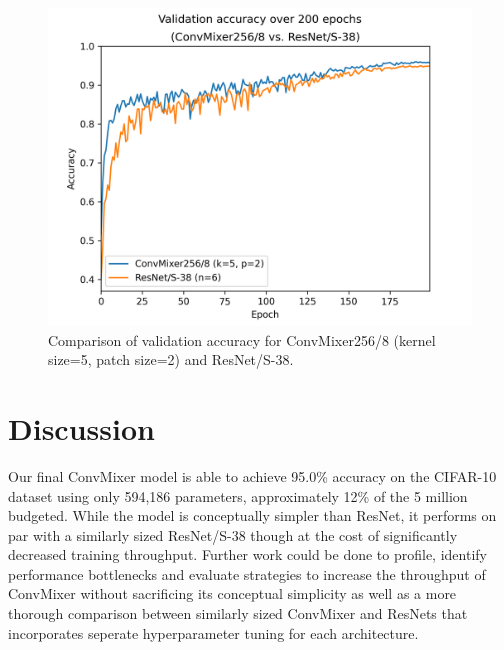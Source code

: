 \documentclass[letterpaper]{article} %
\begin{document}
  \begin{figure}
    \includegraphics[width=\linewidth]{final_validation.png}
    \caption{Comparison of validation accuracy for ConvMixer256/8 (kernel size=5, patch size=2) and ResNet/S-38.}
  \end{figure}

\section{Discussion}

Our final ConvMixer model is able to achieve 95.0\% accuracy on the CIFAR-10 dataset using only 594,186 parameters, approximately 12\% of the 5 million budgeted. While the model is conceptually simpler than ResNet, it performs on par with a similarly sized ResNet/S-38 though at the cost of significantly decreased training throughput. Further work could be done to profile, identify performance bottlenecks and evaluate strategies to increase the throughput of ConvMixer without sacrificing its conceptual simplicity as well as a more thorough comparison between similarly sized ConvMixer and ResNets that incorporates seperate hyperparameter tuning for each architecture.   

\appendix


\end{document}
